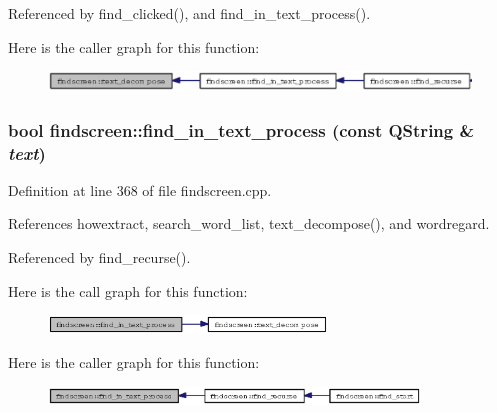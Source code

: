 Referenced by find\_\-clicked(), and find\_\-in\_\-text\_\-process().

Here is the caller graph for this function:\begin{figure}[H]
\begin{center}
\leavevmode
\includegraphics[width=378pt]{classfindscreen_b5b73fe86f25f27694aabb126539f8f2_icgraph}
\end{center}
\end{figure}
\subsubsection{\setlength{\rightskip}{0pt plus 5cm}bool findscreen::find\_\-in\_\-text\_\-process (const QString \& {\em text})\hspace{0.3cm}{\tt  [private]}}\label{classfindscreen_d23331d7a6cfd344c12f876fc8e93e31}




Definition at line 368 of file findscreen.cpp.

References howextract, search\_\-word\_\-list, text\_\-decompose(), and wordregard.

Referenced by find\_\-recurse().

Here is the call graph for this function:\begin{figure}[H]
\begin{center}
\leavevmode
\includegraphics[width=210pt]{classfindscreen_d23331d7a6cfd344c12f876fc8e93e31_cgraph}
\end{center}
\end{figure}


Here is the caller graph for this function:\begin{figure}[H]
\begin{center}
\leavevmode
\includegraphics[width=280pt]{classfindscreen_d23331d7a6cfd344c12f876fc8e93e31_icgraph}
\end{center}
\end{figure}


